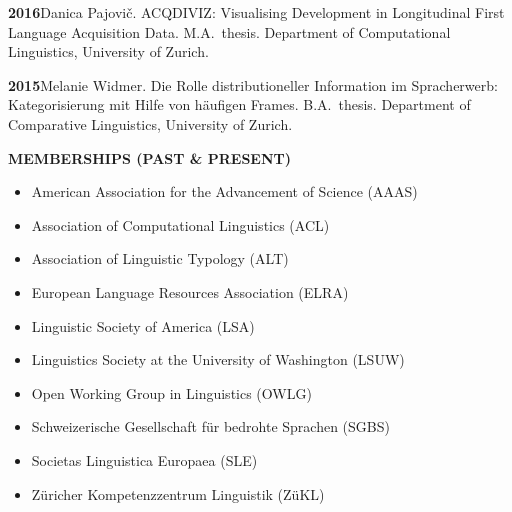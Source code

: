 \documentclass[11pt]{article}
\newcommand{\hangpara}{
 \setlength{\parindent}{0in} %
 \hangindent=0.42in %
}
\begin{document}
\hangpara
\vskip 6pt
{\bf 2016}\hspace{1ex}Danica Pajovi{\v c}. ACQDIVIZ: Visualising Development in Longitudinal First Language Acquisition Data. M.A.\ thesis. Department of Computational Linguistics, University of Zurich.

\vskip 6pt
\hangpara
{\bf 2015}\hspace{1ex}Melanie Widmer. Die Rolle distributioneller Information im Spracherwerb: Kategorisierung mit Hilfe von h{\"a}ufigen Frames. B.A.\ thesis. Department of Comparative Linguistics, University of Zurich.


\vskip 10pt
\begin{flushleft}
{\bf MEMBERSHIPS (PAST \& PRESENT)}
\end{flushleft}
\begin{itemize}
\item American Association for the Advancement of Science (AAAS)
\item Association of Computational Linguistics (ACL)
\item Association of Linguistic Typology (ALT)
\item European Language Resources Association (ELRA)
\item Linguistic Society of America (LSA)
\item Linguistics Society at the University of Washington (LSUW)
\item Open Working Group in Linguistics (OWLG)
\item Schweizerische Gesellschaft f{\"u}r bedrohte Sprachen (SGBS)
\item Societas Linguistica Europaea (SLE)
\item Z{\"u}richer Kompetenzzentrum Linguistik (Z{\"u}KL)
\end{itemize}
\end{document}
